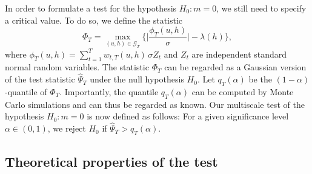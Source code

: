 In order to formulate a test for the hypothesis $H_0: m = 0$, we still need to specify a critical value. To do so, we define the statistic
\begin{equation}\label{Phi-statistic}
\Phi_T = \max_{(u,h) \in \mathcal{G}_T} \Big\{ \Big|\frac{\phi_T(u,h)}{\sigma}\Big| - \lambda(h) \Big\},
\end{equation} 
where $\phi_T(u,h) = \sum\nolimits_{t=1}^T w_{t,T}(u,h) \, \sigma Z_t$ and $Z_t$ are independent standard normal random variables. The statistic $\Phi_T$ can be regarded as a Gaussian version of the test statistic $\widehat{\Psi}_T$ under the null hypothesis $H_0$. Let $q_T(\alpha)$ be the $(1-\alpha)$-quantile of $\Phi_T$. Importantly, the quantile $q_T(\alpha)$ can be computed by Monte Carlo simulations and can thus be regarded as known. Our multiscale test of the hypothesis $H_0: m = 0$ is now defined as follows: For a given significance level $\alpha \in (0,1)$, we reject $H_0$ if $\widehat{\Psi}_T > q_T(\alpha)$. 


\subsection{Theoretical properties of the test}\label{subsec-method-theo}


